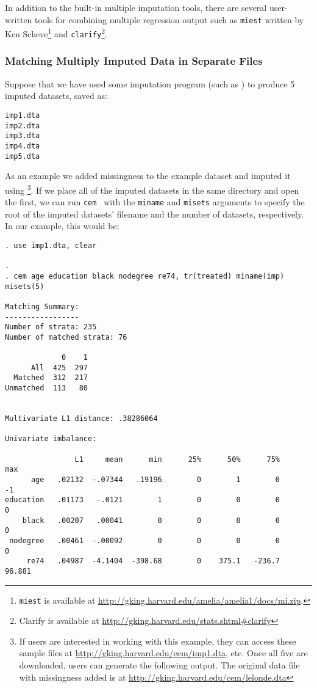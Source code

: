 \documentclass[11pt,titlepage]{article}
\newcommand{\cem}{\texttt{cem }}
\begin{document}
In addition to the built-in multiple imputation tools, there are
several user-written tools for combining multiple regression output
such as \texttt{miest} written by Ken Scheve\footnote{\texttt{miest}
  is available at
  \url{http://gking.harvard.edu/amelia/amelia1/docs/mi.zip}.} and
\texttt{clarify}\footnote{Clarify is available at
  \url{http://gking.harvard.edu/stats.shtml\#clarify}}.

\subsubsection{Matching Multiply Imputed Data in Separate Files}\label{s:mvmi}

Suppose that we have used some imputation program (such as
\citep{HonKinBLa10}) to produce 5 imputed datasets, saved as:

\begin{verbatim}
imp1.dta
imp2.dta
imp3.dta
imp4.dta
imp5.dta
\end{verbatim}

As an example we added missingness to the example dataset and imputed it
using \citet{HonKinBLa10}\footnote{If users are interested in working with
  this example, they can access these sample files at
  \url{http://gking.harvard.edu/cem/imp1.dta}, etc. Once all five are
  downloaded, users can generate the following output. The original data
  file with missingness added is at
  \url{http://gking.harvard.edu/cem/lelonde.dta}}. If we place all of the
imputed datasets in the same directory and open the first, we can run  \cem
with the \texttt{miname} and \texttt{misets} arguments to specify the
root of the imputed datasets' filename and the number of datasets,
respectively.  In our example, this would be:

\begin{verbatim}
. use imp1.dta, clear

. 
. cem age education black nodegree re74, tr(treated) miname(imp) misets(5)

Matching Summary:
-----------------
Number of strata: 235
Number of matched strata: 76

             0    1
      All  425  297
  Matched  312  217
Unmatched  113   80


Multivariate L1 distance: .38286064

Univariate imbalance:

                L1     mean      min      25%      50%      75%      max
      age   .02132  -.07344   .19196        0        1        0       -1
education   .01173   -.0121        1        0        0        0        0
    black   .00207   .00041        0        0        0        0        0
 nodegree   .00461  -.00092        0        0        0        0        0
     re74   .04987  -4.1404  -398.68        0    375.1   -236.7   96.881

\end{verbatim}
\end{document}
